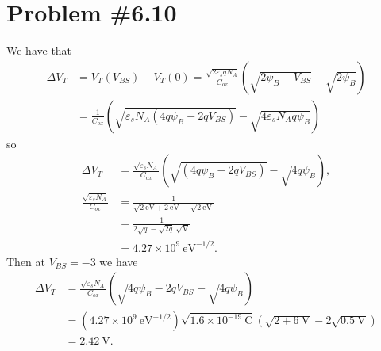 \documentclass{article}
\begin{document}
\section*{Problem \#6.10}

We have that
\begin{align*}
\Delta V_T &= V_T(V_{BS}) - V_T(0) = \frac{\sqrt{2 \varepsilon_s q N_A}}{C_{ox}}
                                    (\sqrt{2 \psi_B - V_{BS}} - \sqrt{2 \psi_B}) \\
           &= \frac{1}{C_{ox}}
              (\sqrt{\varepsilon_s N_A (4q\psi_B - 2q V_{BS})}
            - \sqrt{4\varepsilon_s N_A q \psi_B})
\end{align*}
so
\begin{align*}
\Delta V_T &= \frac{\sqrt{\varepsilon_s N_A}}{C_{ox}}
              (\sqrt{(4q\psi_B - 2q V_{BS})}
            - \sqrt{4q \psi_B}), \\
\frac{\sqrt{\varepsilon_s N_A}}{C_{ox}} &=
    \frac{1}{\sqrt{2 ~\mathrm{eV} + 2 ~\mathrm{eV}} - \sqrt{2 ~\mathrm{eV}}} \\
&=  \frac{1}{2\sqrt{q} - \sqrt{2q} ~\sqrt{\mathrm{V}}} \\
&=  4.27 \times 10^{9} ~\mathrm{eV}^{-1/2}.
\end{align*}
Then at $V_{BS} = -3$ we have
\begin{align*}
  \Delta V_T &= \frac{\sqrt{\varepsilon_s N_A}}{C_{ox}}
                (\sqrt{4 q \psi_B - 2q V_{BS}} - \sqrt{4 q \psi_B}) \\
             &= (4.27 \times 10^{9} ~\mathrm{eV}^{-1/2})
                \sqrt{1.6 \times 10^{-19} ~\mathrm{C}}
                (\sqrt{2 + 6 ~\mathrm{V}}
               - 2\sqrt{0.5 ~\mathrm{V}}) \\
             &= 2.42 ~\mathrm{V}.
\end{align*}

\pagebreak
\end{document}
